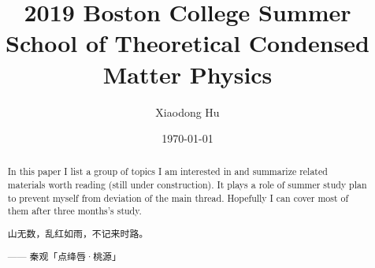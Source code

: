 \documentclass[10pt,nofootinbib]{revtex4}
\begin{document}
\title{2019 Boston College Summer School of Theoretical Condensed Matter Physics}
\author{Xiaodong Hu}

\date{\today}

\begin{abstract}
	In this paper I list a group of topics I am interested in and summarize related materials worth reading (still under construction). It plays a role of summer study plan to prevent myself from deviation of the main thread. Hopefully I can cover most of them after three months's study.\par
		\hfill\par
		{\centering\kaishu 山无数，乱红如雨，不记来时路。\par}
	\hfill------ 秦观「点绛唇·桃源」
\end{abstract}

\maketitle
\end{document}
